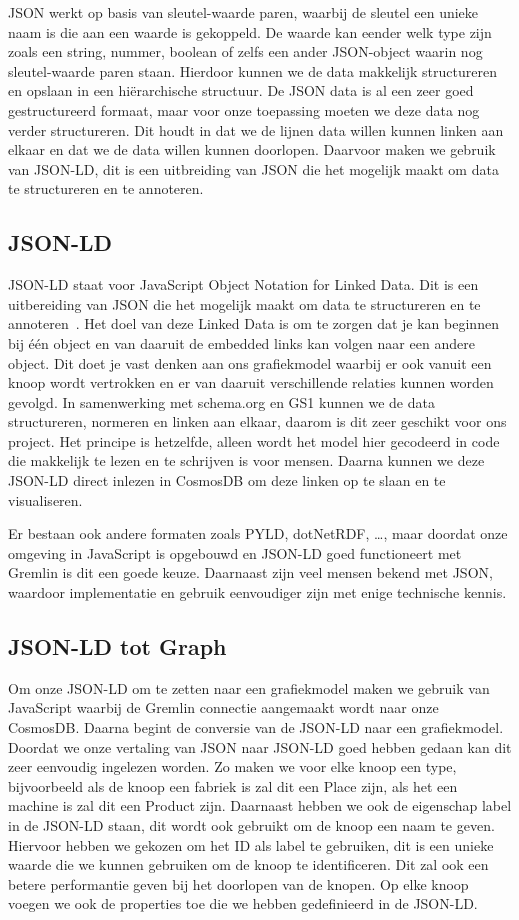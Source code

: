 JSON werkt op basis van sleutel-waarde paren, waarbij de sleutel een unieke naam is die aan een waarde is gekoppeld.
De waarde kan eender welk type zijn zoals een string, nummer, boolean of zelfs een ander JSON-object waarin nog sleutel-waarde paren staan.
Hierdoor kunnen we de data makkelijk structureren en opslaan in een hiërarchische structuur.
De JSON data is al een zeer goed gestructureerd formaat, maar voor onze toepassing moeten we deze data nog verder structureren.
Dit houdt in dat we de lijnen data willen kunnen linken aan elkaar en dat we de data willen kunnen doorlopen.
Daarvoor maken we gebruik van JSON-LD, dit is een uitbreiding van JSON die het mogelijk maakt om data te structureren en te annoteren.

\subsection{JSON-LD}
JSON-LD staat voor JavaScript Object Notation for Linked Data. Dit is een uitbereiding van JSON die het mogelijk maakt om data te structureren en te annoteren~\autocite{jsonld.org}.
Het doel van deze Linked Data is om te zorgen dat je kan beginnen bij één object en van daaruit de embedded links kan volgen naar een andere object. 
Dit doet je vast denken aan ons grafiekmodel waarbij er ook vanuit een knoop wordt vertrokken en er van daaruit verschillende relaties kunnen worden gevolgd.
In samenwerking met schema.org en GS1 kunnen we de data structureren, normeren en linken aan elkaar, daarom is dit zeer geschikt voor ons project. 
Het principe is hetzelfde, alleen wordt het model hier gecodeerd in code die makkelijk te lezen en te schrijven is voor mensen. 
Daarna kunnen we deze JSON-LD direct inlezen in CosmosDB om deze linken op te slaan en te visualiseren.

Er bestaan ook andere formaten zoals PYLD, dotNetRDF, \dots, maar doordat onze omgeving in JavaScript is opgebouwd en JSON-LD goed functioneert met Gremlin is dit een goede keuze.
Daarnaast zijn veel mensen bekend met JSON, waardoor implementatie en gebruik eenvoudiger zijn met enige technische kennis.

\subsection{JSON-LD tot Graph}
Om onze JSON-LD om te zetten naar een grafiekmodel maken we gebruik van JavaScript waarbij de Gremlin connectie aangemaakt wordt naar onze CosmosDB.\@
Daarna begint de conversie van de JSON-LD naar een grafiekmodel. Doordat we onze vertaling van JSON naar JSON-LD goed hebben gedaan kan dit zeer eenvoudig ingelezen worden.
Zo maken we voor elke knoop een type, bijvoorbeeld als de knoop een fabriek is zal dit een Place zijn, als het een machine is zal dit een Product zijn.
Daarnaast hebben we ook de eigenschap label in de JSON-LD staan, dit wordt ook gebruikt om de knoop een naam te geven.
Hiervoor hebben we gekozen om het ID als label te gebruiken, dit is een unieke waarde die we kunnen gebruiken om de knoop te identificeren.
Dit zal ook een betere performantie geven bij het doorlopen van de knopen. Op elke knoop voegen we ook de properties toe die we hebben gedefinieerd in de JSON-LD.\@

